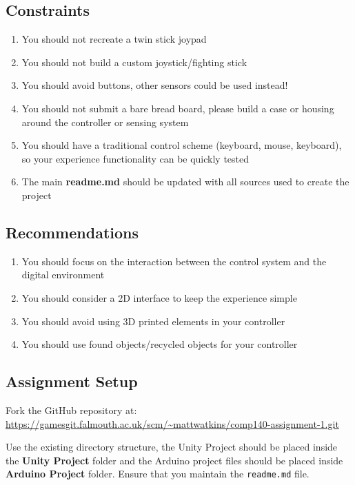 \documentclass{../../fal_assignment}
\begin{document}
	\subsection*{Constraints}
	\begin{enumerate}
		\item You should not recreate a twin stick joypad
		\item You should not build a custom joystick/fighting stick
		\item You should avoid buttons, other sensors could be used instead!
		\item You should not submit a bare bread board, please build a case or housing around the controller or sensing system
		\item You should have a traditional control scheme (keyboard, mouse, keyboard), so your experience functionality can be quickly tested 
		\item The main \textbf{readme.md} should be updated with all sources used to create the project
	\end{enumerate}
	
	\subsection*{Recommendations}
	\begin{enumerate}
		\item You should focus on the interaction between the control system and the digital environment
		\item You should consider a 2D interface to keep the experience simple
		\item You should avoid using 3D printed elements in your controller
		\item You should use found objects/recycled objects for your controller
	\end{enumerate}
	
	\subsection*{Assignment Setup}
	Fork the GitHub repository at:
	\indent \url{https://gamesgit.falmouth.ac.uk/scm/~mattwatkins/comp140-assignment-1.git}
	
	Use the existing directory structure, the Unity Project should be placed inside the \textbf{Unity Project} folder and the Arduino project files should be placed inside \textbf{Arduino Project} folder. Ensure that you maintain the \texttt{readme.md} file.
	
\end{document}
